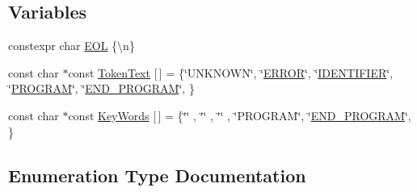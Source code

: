 \subsection*{Variables}
\begin{DoxyCompactItemize}
\item 
constexpr char \hyperlink{namespace_scanner_a7859e3bfe9933aec7ee80c2d4dcfe948}{E\+OL} \{\textquotesingle{}\textbackslash{}n\textquotesingle{}\}
\item 
const char $\ast$const \hyperlink{namespace_scanner_a09cc779e796381e91b23d01033206d4d}{Token\+Text} \mbox{[}$\,$\mbox{]} = \{\char`\"{}U\+N\+K\+N\+O\+WN\char`\"{}, \char`\"{}\hyperlink{namespace_scanner_a1d588ca5cfd26bdff0e59b437da5b166afa7aaa30e05994a154a6659a8fc5bc0a}{E\+R\+R\+OR}\char`\"{}, \char`\"{}\hyperlink{namespace_scanner_a1d588ca5cfd26bdff0e59b437da5b166ad9fa4b9d9c85ef41caa4540fb385491d}{I\+D\+E\+N\+T\+I\+F\+I\+ER}\char`\"{}, \char`\"{}\hyperlink{namespace_scanner_a1d588ca5cfd26bdff0e59b437da5b166aceb64e2af79584079e0e3f3c32ccaf9d}{P\+R\+O\+G\+R\+AM}\char`\"{}, \char`\"{}\hyperlink{namespace_scanner_a1d588ca5cfd26bdff0e59b437da5b166a32d6b00cdc94cf860b8d967cb30d7952}{E\+N\+D\+\_\+\+P\+R\+O\+G\+R\+AM}\char`\"{}, \}
\item 
const char $\ast$const \hyperlink{namespace_scanner_ab32f938f9fc4150c1017a768a8843f85}{Key\+Words} \mbox{[}$\,$\mbox{]} = \{\char`\"{}\char`\"{} , \char`\"{}\char`\"{} , \char`\"{}\char`\"{} , \char`\"{}P\+R\+O\+G\+R\+AM\char`\"{}, \char`\"{}\hyperlink{namespace_scanner_a1d588ca5cfd26bdff0e59b437da5b166a32d6b00cdc94cf860b8d967cb30d7952}{E\+N\+D\+\_\+\+P\+R\+O\+G\+R\+AM}\char`\"{}, \}
\end{DoxyCompactItemize}


\subsection{Enumeration Type Documentation}
